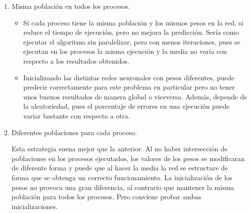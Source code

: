	\begin{enumerate}
		\item Misma población en todos los procesos. 
		
		\begin{itemize}
			\item Si cada proceso tiene la misma población y los mismos pesos en la red, si reduce el tiempo de ejecución, pero no mejora la predicción. Sería como ejecutar el algoritmo sin paralelizar, pero con menos iteraciones, pues se ejecutan en los procesos la misma ejecución y la media no varía con respecto a los resultados obtenidos.
			\item Inicializando las distintas redes neuronales con pesos diferentes, puede predecir correctamente para este problema en particular pero no tener unos buenos resultados de manera global o viceversa. Además, depende de la aleatoriedad, pues el porcentaje de errores en una ejecución puede variar bastante con respecto a otra. 
		\end{itemize} 
		
		\item Diferentes poblaciones para cada proceso. 
		
		Esta estrategia suena mejor que la anterior. Al no haber intersección de poblaciones en los procesos ejecutados, los valores de los pesos se modificaran de diferente forma y puede que al hacer la media la red se estructure de forma que se obtenga un correcto funcionamiento. La inicialización de los pesos no provoca una gran diferencia, al contrario que mantener la misma población para todos los procesos. Pero conviene probar ambas inicializaciones.	
		
		
	\end{enumerate}	
	
	

	
